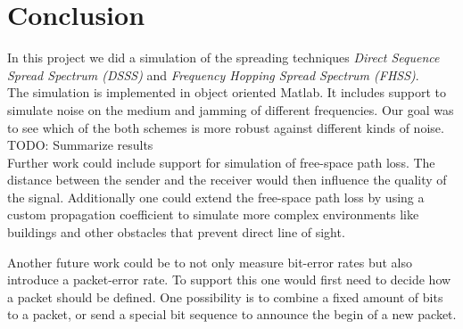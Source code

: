 \section{Conclusion}
    In this project we did a simulation of the spreading techniques \emph{Direct Sequence Spread Spectrum (DSSS)} and \emph{Frequency Hopping Spread Spectrum (FHSS)}.\\
    
    
    The simulation is implemented in object oriented Matlab. It includes support to simulate noise on the medium and jamming of different frequencies. Our goal was to see which of the both schemes is more robust against different kinds of noise.\\
    
    
    TODO: Summarize results\\
    
    
    Further work could include support for simulation of free-space path loss. The distance between the sender and the receiver would then influence the quality of the signal. Additionally one could extend the free-space path loss by using a custom propagation coefficient to simulate more complex environments like buildings and other obstacles that prevent direct line of sight.
    
    
    Another future work could be to not only measure bit-error rates but also introduce a packet-error rate. To support this one would first need to decide how a packet should be defined. One possibility is to combine a fixed amount of bits to a packet, or send a special bit sequence to announce the begin of a new packet.